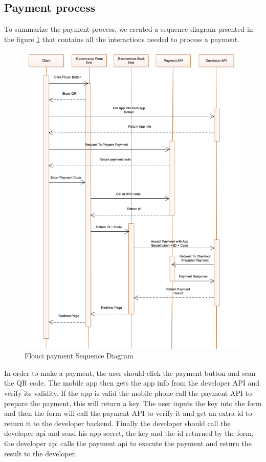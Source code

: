 \begin{spacing}{1.2}
\section{Payment process}
To summarize the payment process, we created a sequence diagram prsented in the figure \ref{fig:FPSD} that contains all the interactions needed to process a payment.
\begin{figure}[H]\centering
\includegraphics[scale=0.6]{Payment_Sequence_Diagram.png}
\caption{Flouci payment Sequence Diagram}
\label{fig:FPSD}
\end{figure}
In order to make a payment, the user should click the payment button and scan the QR code. The mobile app then gets the app info from the developer API and verify its validity. If the app is valid the mobile phone call the payment API to prepare the payment, this will return a key. The user inputs the key into the form and then the form will call the payment API to verify it and get an extra id to return it to the developer backend. Finally the developer should call the developer api and send his app secret, the key and the id returned by the form, the developer api calls the payment api to execute the payment and return the result to the developer.

\end{spacing}
